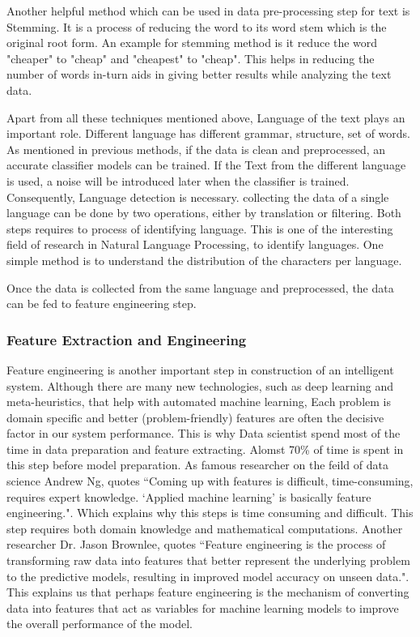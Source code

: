 Another helpful method which can be used in data pre-processing step for text is Stemming. It is a process of reducing the word to its word stem which is the original root form. An example for stemming method is it reduce the word "cheaper" to "cheap" and "cheapest" to "cheap". This helps in reducing the number of words in-turn aids in giving better results while analyzing the text data.

Apart from all these techniques mentioned above, Language of the text plays an important role. Different language has different grammar, structure, set of words. As mentioned in previous methods, if the data is clean and preprocessed, an  accurate classifier models can be trained. If the Text from the different language is used, a noise will be introduced later when the classifier is trained.  Consequently, Language detection is necessary. collecting the data of a single language can be done by two operations, either by translation or filtering. Both steps requires to process of identifying language. This is one of the interesting field of research in Natural Language Processing, to identify languages. One simple method is to understand the distribution of the characters per language.

Once the data is collected from the same language and preprocessed, the data can be fed to feature engineering step.

\subsubsection{Feature Extraction and Engineering}

Feature engineering is another important step in construction of an intelligent system. Although there are many new technologies, such as deep learning and meta-heuristics, that help with automated machine learning, Each problem is domain specific and better (problem-friendly) features are often the decisive factor in our system performance. This is why Data scientist spend most of the time in data preparation and feature extracting. Alomst 70\% of time is spent in this step before model preparation. As famous researcher on the feild of data science Andrew Ng, quotes ``Coming up with features is difficult, time-consuming, requires expert knowledge. `Applied machine learning' is basically feature engineering.". Which explains why this steps is time consuming and difficult. This step requires both domain knowledge and mathematical computations. Another researcher Dr. Jason Brownlee, quotes ``Feature engineering is the process of transforming raw data into features that better represent the underlying problem to the predictive models, resulting in improved model accuracy on unseen data.". This explains us that perhaps feature engineering is the mechanism of converting data into features that act as variables for machine learning models to improve the overall performance of the model.

